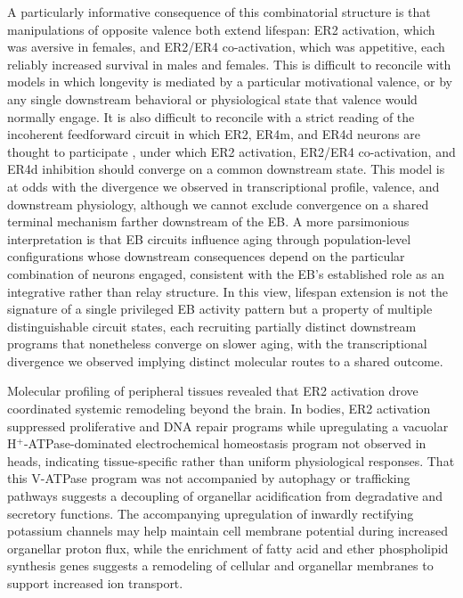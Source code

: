 A particularly informative consequence of this combinatorial structure is that manipulations of opposite valence both extend lifespan: ER2 activation, which was aversive in females, and ER2/ER4 co-activation, which was appetitive, each reliably increased survival in males and females.
This is difficult to reconcile with models in which longevity is mediated by a particular motivational valence, or by any single downstream behavioral or physiological state that valence would normally engage.
It is also difficult to reconcile with a strict reading of the incoherent feedforward circuit in which ER2, ER4m, and ER4d neurons are thought to participate \citep{ishimoto2020}, under which ER2 activation, ER2/ER4 co-activation, and ER4d inhibition should converge on a common downstream state. This model is at odds with the divergence we observed in transcriptional profile, valence, and downstream physiology, although we cannot exclude convergence on a shared terminal mechanism farther downstream of the EB.
A more parsimonious interpretation is that EB circuits influence aging through population-level configurations whose downstream consequences depend on the particular combination of neurons engaged, consistent with the EB's established role as an integrative rather than relay structure.
In this view, lifespan extension is not the signature of a single privileged EB activity pattern but a property of multiple distinguishable circuit states, each recruiting partially distinct downstream programs that nonetheless converge on slower aging, with the transcriptional divergence we observed implying distinct molecular routes to a shared outcome.

Molecular profiling of peripheral tissues revealed that ER2 activation drove coordinated systemic remodeling beyond the brain.
In bodies, ER2 activation suppressed proliferative and DNA repair programs while upregulating a vacuolar H$^{+}$-ATPase-dominated electrochemical homeostasis program not observed in heads, indicating tissue-specific rather than uniform physiological responses.
That this V-ATPase program was not accompanied by autophagy or trafficking pathways suggests a decoupling of organellar acidification from degradative and secretory functions.
The accompanying upregulation of inwardly rectifying potassium channels may help maintain cell membrane potential during increased organellar proton flux, while the enrichment of fatty acid and ether phospholipid synthesis genes suggests a remodeling of cellular and organellar membranes to support increased ion transport.

